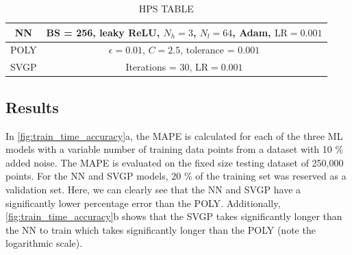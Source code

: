 \begin{table}
	\centering
	\begin{tabular}{|c|c|}
		\hline
		NN & BS = 256, leaky ReLU, $N_h = 3$, $N_l = 64$, Adam, $\text{LR}=0.001$ \\
		\hline
		POLY & $\epsilon = 0.01$, $C = 2.5$, tolerance = $0.001$ \\
		\hline
		SVGP & Iterations = 30, $\text{LR}=0.001$ \\
		\hline
	\end{tabular}
	\caption{HPS TABLE}
	\label{tab:hps2}
\end{table}

\subsection{Results}

In \autoref{fig:train_time_accuracy}a, the \gls{MAPE} is calculated for each of the three \gls{ML} models with a variable number of training data points from a dataset with 10 \% added noise. The \gls{MAPE} is evaluated on the fixed size testing dataset of 250,000 points. For the \gls{NN} and \gls{SVGP} models, 20 \% of the training set was reserved as a validation set. Here, we can clearly see that the \gls{NN} and \gls{SVGP} have a significantly lower percentage error than the \gls{POLY}. Additionally, \autoref{fig:train_time_accuracy}b shows that the \gls{SVGP} takes significantly longer than the \gls{NN} to train which takes significantly longer than the \gls{POLY} (note the logarithmic scale).


